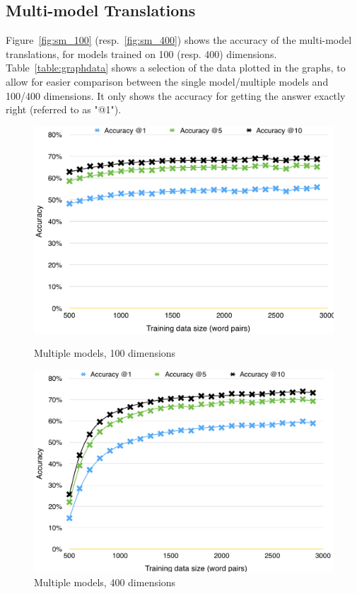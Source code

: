 \subsection{Multi-model Translations}
Figure~\ref{fig:sm_100} (resp.~\ref{fig:sm_400}) shows the accuracy of the multi-model translations, for models trained on 100 (resp. 400) dimensions. Table~\ref{table:graphdata} shows a selection of the data plotted in the graphs, to allow for easier comparison between the single model/multiple models and 100/400 dimensions. It only shows the accuracy for getting the answer exactly right (referred to as "@1").

\begin{figure}[!htb]
    \centering
    \begin{minipage}{\textwidth}
      \centering
      \begin{minipage}{.45\textwidth}
          \includegraphics[width=\linewidth]{images/multiple_model_100_dim}
          \caption{Multiple models, 100 dimensions}
          \label{fig:mm_100}
      \end{minipage}
      \begin{minipage}{.45\textwidth}
          \includegraphics[width=\linewidth]{images/multiple_model_400_dim}
          \caption{Multiple models, 400 dimensions}
          \label{fig:mm_400}
      \end{minipage}
    \end{minipage}
\end{figure}

